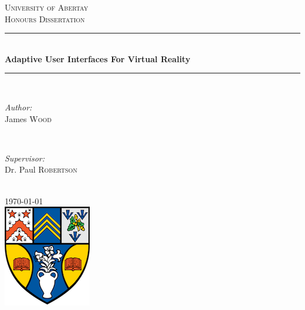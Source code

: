 \documentclass[12pt]{article}
\begin{document}
\begin{titlepage}

\newcommand{\HRule}{\rule{\linewidth}{0.5mm}}

\center

\textsc{\LARGE University of Abertay}\\[1.5cm]
\textsc{\Large Honours Dissertation}\\[0.5cm]

\HRule \\[0.4cm]
{ \huge \bfseries Adaptive User Interfaces For Virtual Reality}\\[0.4cm]
\HRule \\[1.5cm]

\begin{minipage}{0.4\textwidth}
\begin{flushleft} \large
\emph{Author:}\\
James \textsc{Wood}
\end{flushleft}
\end{minipage}
~
\begin{minipage}{0.4\textwidth}
\begin{flushright} \large
\emph{Supervisor:} \\
Dr. Paul \textsc{Robertson}
\end{flushright}
\end{minipage}\\[2cm]

{\large \today}\\[2cm]

\includegraphics{logo.png}\\[1cm]

\vfill

\end{titlepage}

\pagebreak

\tableofcontents
\listoffigures
\listoftables
\thispagestyle{empty}

\pagebreak

\setcounter{page}{1}

\thispagestyle{empty}
\end{document}
